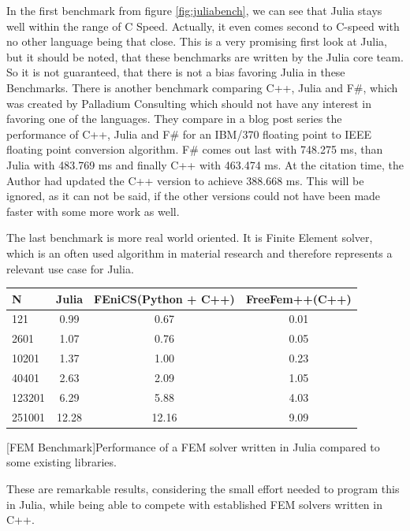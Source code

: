 In the first benchmark from figure \ref{fig:juliabench}, we can see that Julia stays well within the range of C Speed. 
Actually, it even comes second to C-speed with no other language being that close.
This is a very promising first look at Julia, but it should be noted, that these benchmarks are written by the Julia core team.
So it is not guaranteed, that there is not a bias favoring Julia in these Benchmarks.
There is another benchmark comparing C++, Julia and F#, which was created by Palladium Consulting which should not have any interest in favoring one of the languages.
They compare in a blog post series \cite{JuliaFSCpp} the performance of C++, Julia and F# for an IBM/370 floating point to IEEE floating point conversion algorithm.
F# comes out last with 748.275 ms, than Julia with 483.769 ms and finally C++ with 463.474 ms. 
At the citation time, the Author had updated the C++ version to achieve 388.668 ms. 
This will be ignored, as it can not be said, if the other versions could not have been made faster with some more work as well.

The last benchmark is more real world oriented. 
It is Finite Element solver, which is an often used algorithm in material research and therefore represents a relevant use case for Julia.

\begin{table}[htbp]
    \centering
    \begin{tabular}{l|c|c|c}
        \hline
        \textbf{N}  & \textbf{Julia} & \textbf{FEniCS(Python + C++)}  & \textbf{FreeFem++(C++)}\\
        \hline
        121         & 0.99           & 0.67             & 0.01 \\
        2601        & 1.07           & 0.76             & 0.05 \\
        10201       & 1.37           & 1.00             & 0.23 \\
        40401       & 2.63           & 2.09             & 1.05 \\
        123201      & 6.29           & 5.88             & 4.03 \\
        251001      & 12.28          & 12.16            & 9.09 \\
        \hline
    \end{tabular}
    [FEM Benchmark]{Performance of a FEM solver written in Julia compared to some existing libraries. \cite{FMSolver}}
    \label{table:fembench}
\end{table}
These are remarkable results, considering the small effort needed to program this in Julia, while being able to compete with established FEM solvers written in C++.


